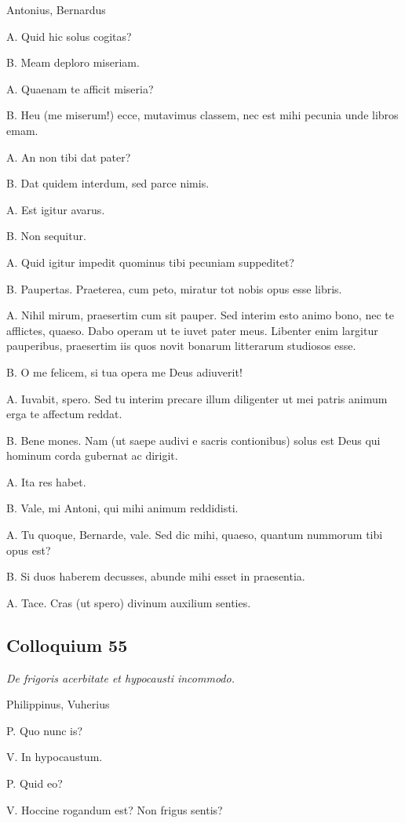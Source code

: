 \documentclass{article}
\begin{document}
Antonius, Bernardus

A. Quid hic solus cogitas?

B. Meam deploro miseriam. 

A. Quaenam te afficit miseria?

B. Heu (me miserum!) ecce, mutavimus classem, nec est mihi pecunia unde libros emam. 

A. An non tibi dat pater?

B. Dat quidem interdum, sed parce nimis. 

A. Est igitur avarus. 

B. Non sequitur. 

A. Quid igitur impedit quominus tibi pecuniam suppeditet?

B. Paupertas. Praeterea, cum peto, miratur tot nobis opus esse libris. 

A. Nihil mirum, praesertim cum sit pauper. Sed interim esto animo bono, nec te afflictes, quaeso. Dabo operam ut te iuvet pater meus. Libenter enim largitur pauperibus, praesertim iis quos novit bonarum litterarum studiosos esse. 

B. O me felicem, si tua opera me Deus adiuverit!

A. Iuvabit, spero. Sed tu interim precare illum diligenter ut mei patris animum erga te affectum reddat. 

B. Bene mones. Nam (ut saepe audivi e sacris contionibus) solus est Deus qui hominum corda gubernat ac dirigit.

A. Ita res habet. 

B. Vale, mi Antoni, qui mihi animum reddidisti. 

A. Tu quoque, Bernarde, vale. Sed dic mihi, quaeso, quantum nummorum tibi opus est?

B. Si duos haberem decusses, abunde mihi esset in praesentia. 

A. Tace. Cras (ut spero) divinum auxilium senties. 

\subsection{Colloquium 55}
\emph{De frigoris acerbitate et hypocausti incommodo.}

Philippinus, Vuherius

P. Quo nunc is?

V. In hypocaustum. 

P. Quid eo?

V. Hoccine rogandum est? Non frigus sentis?
\end{document}
